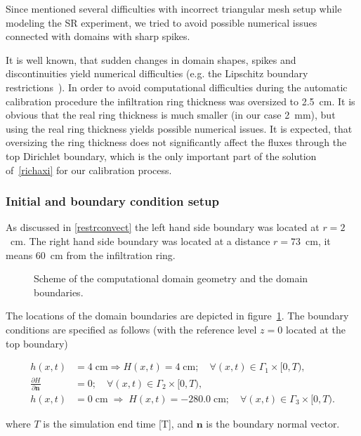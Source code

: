 \documentclass[review,times,3p,twocolumn,10pt]{elsarticle}
\newenvironment{lineq}
    {\begin{linenomath*}
    \begin{equation}
    }
    { 
    \end{equation} 
    \end{linenomath*}
    }
\renewcommand{\vec}{\mathbf}
\begin{document}
Since \cite{Dusek} mentioned several difficulties with incorrect triangular mesh setup while modeling the SR experiment, we tried to avoid possible numerical issues connected with domains with sharp spikes.


It is well known, that sudden changes in domain shapes, spikes and discontinuities yield numerical difficulties (e.g. the Lipschitz boundary restrictions~\citep{braess}).
In order to avoid computational difficulties during the automatic calibration procedure the infiltration ring thickness was oversized  to 2.5~cm. It is obvious that the real ring thickness is much smaller (in our case 2~mm), but using the real ring thickness yields possible numerical issues.  It is expected, that oversizing the ring thickness does not significantly affect the fluxes through the top Dirichlet boundary, which is the only important part of the solution of~\eqref{richaxi} for our calibration process.

\subsubsection{Initial and boundary condition setup}

As discussed in \ref{restrconvect} the left hand side boundary was located at $r=2$~cm. The right hand side boundary was located at a distance $r=73$~cm, it means 60~cm from the infiltration ring. 

 \begin{figure}
\centering
{}
 \caption{Scheme of the computational domain geometry and the domain boundaries.}
 \label{valecbc}
\end{figure}


The locations of the domain boundaries are depicted in figure~\ref{valecbc}. The boundary conditions are specified as follows (with the reference level $z=0$ located at the top boundary)
\begin{lineq} 
\begin{split}
h(x,t) &= 4 \; \mbox{cm} \Rightarrow H(x,t) = 4 \; \mbox{cm}; \quad \forall (x,t) \in \Gamma_1 \times [0,T), \\
\frac{\partial H}{\partial \vec{n}} &= 0; \quad \forall (x,t) \in \Gamma_2 \times [0,T), \\
h(x,t) &= 0  \; \mbox{cm}  \; \Rightarrow \; H(x,t) = -280.0  \; \mbox{cm}; \quad \forall (x,t) \in \Gamma_3 \times [0,T).
\end{split}
\end{lineq}
where $T$ is the simulation end time [T], and $\vec{n}$ is the boundary normal vector.
\end{document}
